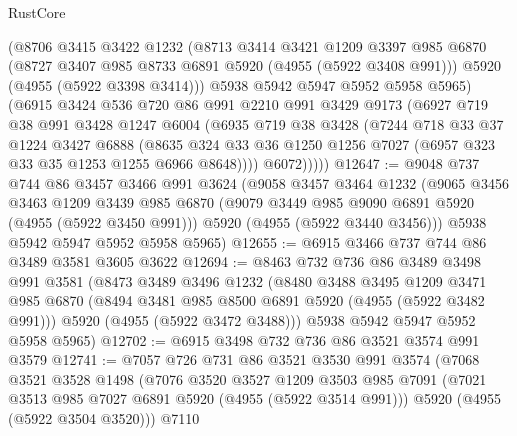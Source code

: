 \begin{lexlean}{RustCore}
\begin{coremodule}
          (@8706
            @3415
            @3422
            @1232
            (@8713
              @3414
              @3421
              @1209
              @3397
              @985
              @6870
              (@8727 @3407 @985 @8733 @6891 @5920 (@4955 (@5922 @3408 @991)))
              @5920
              (@4955 (@5922 @3398 @3414)))
            @5938
            @5942
            @5947
            @5952
            @5958
            @5965)
          (@6915
            @3424
            @536
            @720
            @86
            @991
            @2210
            @991
            @3429
            @9173
            (@6927
              @719
              @38
              @991
              @3428
              @1247
              @6004
              (@6935
                @719
                @38
                @3428
                (@7244
                  @718
                  @33
                  @37
                  @1224
                  @3427
                  @6888
                  (@8635
                    @324
                    @33
                    @36
                    @1250
                    @1256
                    @7027
                    (@6957 @323 @33 @35 @1253 @1255 @6966 @8648))))
              @6072)))))
@12647 := @9048
    @737
    @744
    @86
    @3457
    @3466
    @991
    @3624
    (@9058
      @3457
      @3464
      @1232
      (@9065
        @3456
        @3463
        @1209
        @3439
        @985
        @6870
        (@9079 @3449 @985 @9090 @6891 @5920 (@4955 (@5922 @3450 @991)))
        @5920
        (@4955 (@5922 @3440 @3456)))
      @5938
      @5942
      @5947
      @5952
      @5958
      @5965)
@12655 := @6915 @3466 @737 @744 @86 @3489 @3581 @3605 @3622
@12694 := @8463
    @732
    @736
    @86
    @3489
    @3498
    @991
    @3581
    (@8473
      @3489
      @3496
      @1232
      (@8480
        @3488
        @3495
        @1209
        @3471
        @985
        @6870
        (@8494 @3481 @985 @8500 @6891 @5920 (@4955 (@5922 @3482 @991)))
        @5920
        (@4955 (@5922 @3472 @3488)))
      @5938
      @5942
      @5947
      @5952
      @5958
      @5965)
@12702 := @6915 @3498 @732 @736 @86 @3521 @3574 @991 @3579
@12741 := @7057
    @726
    @731
    @86
    @3521
    @3530
    @991
    @3574
    (@7068
      @3521
      @3528
      @1498
      (@7076
        @3520
        @3527
        @1209
        @3503
        @985
        @7091
        (@7021 @3513 @985 @7027 @6891 @5920 (@4955 (@5922 @3514 @991)))
        @5920
        (@4955 (@5922 @3504 @3520)))
      @7110

\end{coremodule}
\end{lexlean}
